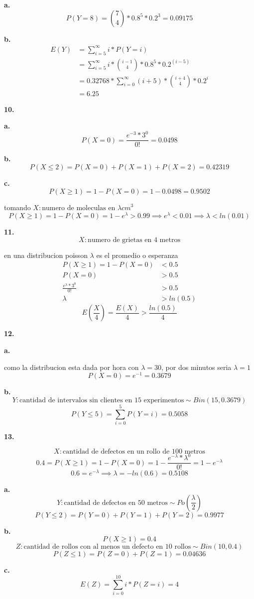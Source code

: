 \documentclass[12pt,fleqn]{article}
\begin{document}
\textbf{a.}
\[P(Y=8)=\binom{7}{4}*0.8^5*0.2^3=0.09175\]

\textbf{b.}
\begin{align*}
  E(Y)&=\sum_{i=5}^{\infty} i*P(Y=i)\\
      &=\sum_{i=5}^{\infty} i*\binom{i-1}{4}*0.8^5*0.2^{(i-5)}\\
      &=0.32768*\sum_{i=0}^{\infty} (i+5)*\binom{i+4}{4}*0.2^i\\
      &=6.25
\end{align*}

\textbf{10.}

\textbf{a.}
\[P(X=0)=\frac{e^{-3}*3^0}{0!}=0.0498\]

\textbf{b.}
\[P(X \le 2)=P(X=0)+P(X=1)+P(X=2)=0.42319\]

\textbf{c.}
\[P(X \ge 1)=1-P(X=0)=1-0.0498=0.9502\]

tomando $X: \textrm{numero de moleculas en }\lambda cm^3$
\[P(X \ge 1)=1-P(X=0)=1-e^{\lambda}>0.99 \implies e^{\lambda}<0.01 \implies \lambda<ln(0.01)\]


\textbf{11.}
\[X: \textrm{numero de grietas en 4 metros}\]

en una distribucion poisson $\lambda$ es el promedio o esperanza
\begin{align*}
  P(X \ge 1)=1-P(X=0)&<0.5\\
  P(X=0)&>0.5\\
  \frac{e^{\lambda}*3^0}{0!}&>0.5\\
  \lambda&>ln(0.5)
\end{align*}
\[E(\frac{X}{4})=\frac{E(X)}{4}>\frac{ln(0.5)}{4}\]

\textbf{12.}

\textbf{a.}

como la distribucion esta dada por hora con $\lambda=30$, por dos minutos seria $\lambda=1$
\[P(X=0)=e^{-1}=0.3679\]

\textbf{b.}
\[Y: \textrm{cantidad de intervalos sin clientes en 15 experimentos} \sim Bin(15,0.3679)\]
\[P(Y \le 5)=\sum_{i=0}^5 P(Y=i)=0.5058\]

\textbf{13.}

\[X: \textrm{cantidad de defectos en un rollo de 100 metros}\]
\[0.4=P(X \ge 1)=1-P(X=0)=1-\frac{e^{-\lambda}*\lambda^0}{0!}=1-e^{-\lambda}\]
\[0.6=e^{-\lambda} \implies \lambda=-ln(0.6)=0.5108\]

\textbf{a.}
\[Y: \textrm{cantidad de defectos en 50 metros} \sim Po(\frac{\lambda}{2})\]
\[P(Y \le 2)=P(Y=0)+P(Y=1)+P(Y=2)=0.9977\]

\textbf{b.}
\[P(X \ge 1)=0.4\]
\[Z: \textrm{cantidad de rollos con al menos un defecto en 10 rollos} \sim Bin(10,0.4)\]
\[P(Z \le 1)=P(Z=0)+P(Z=1)=0.04636\]

\textbf{c.}
\[E(Z)=\sum_{i=0}^{10} i*P(Z=i)=4\]
\end{document}
